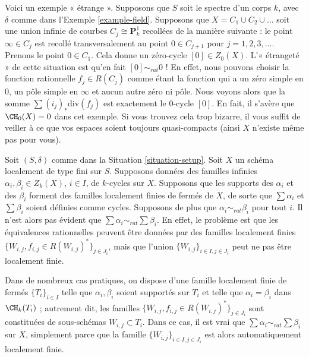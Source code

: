 \begin{example}
\label{example-weird}
Voici un exemple « étrange ».
Supposons que $S$ soit le spectre d'un corps $k$,
avec $\delta$ comme dans l'Exemple \ref{example-field}.
Supposons que $X = C_1 \cup C_2 \cup \ldots$ soit une union infinie
de courbes $C_j \cong \mathbf{P}^1_k$ recollées
de la manière suivante : le point $\infty \in C_j$ est recollé
transversalement au point $0 \in C_{j + 1}$ pour $j = 1, 2, 3, \ldots$.
Prenons le point $0 \in C_1$. Cela donne un zéro-cycle
$[0] \in Z_0(X)$. L'« étrangeté » de cette situation est
qu'en fait $[0] \sim_{rat} 0$ ! En effet, nous pouvons choisir
la fonction rationnelle $f_j \in R(C_j)$ comme étant la fonction
qui a un zéro simple en $0$, un pôle simple en $\infty$
et aucun autre zéro ni pôle. Nous voyons alors que la somme
$\sum (i_j)_*\text{div}(f_j)$ est exactement le $0$-cycle
$[0]$. En fait, il s'avère que $\CH_0(X) = 0$ dans cet exemple.
Si vous trouvez cela trop bizarre, il vous suffit de
veiller à ce que vos espaces soient toujours quasi-compacts
(ainsi $X$ n'existe même pas pour vous).
\end{example}

\begin{remark}
\label{remark-infinite-sums-rational-equivalences}
Soit $(S, \delta)$ comme dans la Situation \ref{situation-setup}.
Soit $X$ un schéma localement de type fini sur $S$.
Supposons données des familles infinies $\alpha_i, \beta_i \in Z_k(X)$,
$i \in I$, de $k$-cycles sur $X$. Supposons que les supports
des $\alpha_i$ et des $\beta_i$ forment des familles localement finies
de fermés de $X$, de sorte que $\sum \alpha_i$
et $\sum \beta_i$ soient définies comme cycles. Supposons de plus que
$\alpha_i \sim_{rat} \beta_i$ pour tout $i$. Il n'est alors pas
évident que $\sum \alpha_i \sim_{rat} \sum \beta_i$. En effet,
le problème est que les équivalences rationnelles peuvent être
données par des
familles localement finies $\{W_{i, j}, f_{i, j} \in R(W_{i, j})^*\}_{j \in J_i}$,
mais que l'union $\{W_{i, j}\}_{i \in I, j\in J_i}$ peut ne pas
être localement finie.

\medskip\noindent
Dans de nombreux cas pratiques, on dispose d'une famille localement finie de fermés
$\{T_i\}_{i \in I}$ telle que $\alpha_i, \beta_i$
soient supportés sur $T_i$ et telle que $\alpha_i = \beta_i$
dans $\CH_k(T_i)$ ; autrement dit, les familles
$\{W_{i, j}, f_{i, j} \in R(W_{i, j})^*\}_{j \in J_i}$
sont constituées de sous-schémas $W_{i, j} \subset T_i$. Dans ce cas, il est vrai que
$\sum \alpha_i \sim_{rat} \sum \beta_i$ sur $X$, simplement parce que
la famille $\{W_{i, j}\}_{i \in I, j\in J_i}$ est alors automatiquement
localement finie.
\end{remark}






